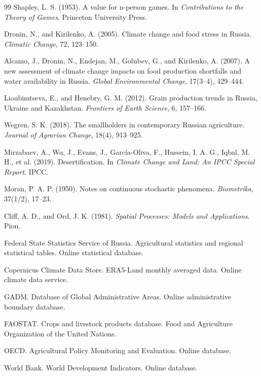 \documentclass[12pt,a4paper]{article}
\begin{document}
\begin{thebibliography}{99}
Shapley, L. S. (1953).
A value for n-person games.
In \textit{Contributions to the Theory of Games}, Princeton University Press.

Dronin, N., and Kirilenko, A. (2005).
Climate change and food stress in Russia.
\textit{Climatic Change}, 72, 123--150.

Alcamo, J., Dronin, N., Endejan, M., Golubev, G., and Kirilenko, A. (2007).
A new assessment of climate change impacts on food production shortfalls and water availability in Russia.
\textit{Global Environmental Change}, 17(3--4), 429--444.

Lioubimtseva, E., and Henebry, G. M. (2012).
Grain production trends in Russia, Ukraine and Kazakhstan.
\textit{Frontiers of Earth Science}, 6, 157--166.

Wegren, S. K. (2018).
The smallholders in contemporary Russian agriculture.
\textit{Journal of Agrarian Change}, 18(4), 913--925.

Mirzabaev, A., Wu, J., Evans, J., Garc{\'i}a-Oliva, F., Hussein, I. A. G., Iqbal, M. H., et al. (2019).
Desertification.
In \textit{Climate Change and Land: An IPCC Special Report}.
IPCC.

Moran, P. A. P. (1950).
Notes on continuous stochastic phenomena.
\textit{Biometrika}, 37(1/2), 17--23.

Cliff, A. D., and Ord, J. K. (1981).
\textit{Spatial Processes: Models and Applications}.
Pion.

Federal State Statistics Service of Russia.
Agricultural statistics and regional statistical tables.
Online statistical database.

Copernicus Climate Data Store.
ERA5-Land monthly averaged data.
Online climate data service.

GADM.
Database of Global Administrative Areas.
Online administrative boundary database.

FAOSTAT.
Crops and livestock products database.
Food and Agriculture Organization of the United Nations.

OECD.
Agricultural Policy Monitoring and Evaluation.
Online database.

World Bank.
World Development Indicators.
Online database.

\end{thebibliography}
\end{document}
